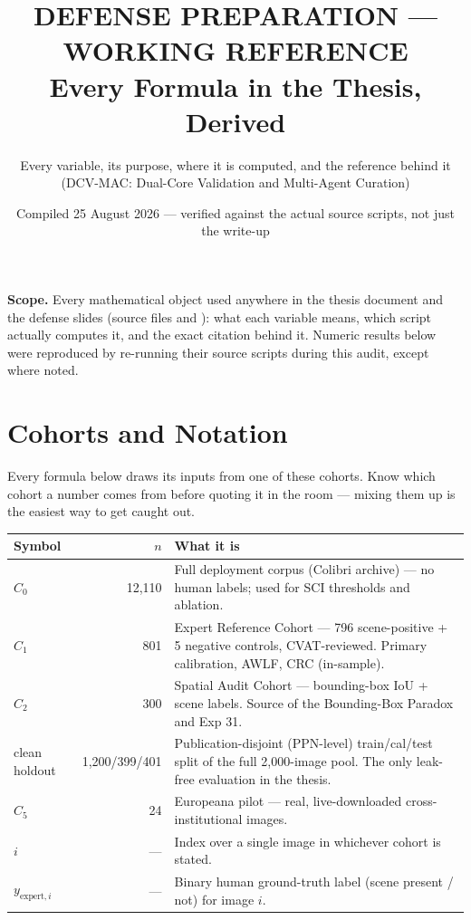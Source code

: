 \documentclass[11pt,a4paper]{article}
\title{\textcolor{AccentInk}{\Large DEFENSE PREPARATION --- WORKING REFERENCE}\\[6pt]
\Huge Every Formula in the Thesis, Derived}
\author{Every variable, its purpose, where it is computed, and the reference behind it \\
\small (DCV-MAC: Dual-Core Validation and Multi-Agent Curation)}
\date{Compiled 25 August 2026 --- verified against the actual source scripts, not just the write-up}
\begin{document}
\maketitle
\thispagestyle{fancy}

\noindent\textbf{Scope.} Every mathematical object used anywhere in the thesis document and the defense slides (source files \texttt{} and \texttt{}): what each variable means, which script actually computes it, and the exact citation behind it. Numeric results below were reproduced by re-running their source scripts during this audit, except where noted.

\tableofcontents
\clearpage

\section{Cohorts and Notation}
Every formula below draws its inputs from one of these cohorts. Know which cohort a number comes from before quoting it in the room --- mixing them up is the easiest way to get caught out.

\begin{center}
\begin{tabular}{@{}lrp{9.7cm}@{}}
\toprule
\textbf{Symbol} & \textbf{$n$} & \textbf{What it is} \\
\midrule
$C_0$ & 12{,}110 & Full deployment corpus (Colibri archive) --- no human labels; used for SCI thresholds and ablation. \\
$C_1$ & 801 & Expert Reference Cohort --- 796 scene-positive + 5 negative controls, CVAT-reviewed. Primary calibration, AWLF, CRC (in-sample). \\
$C_2$ & 300 & Spatial Audit Cohort --- bounding-box IoU + scene labels. Source of the Bounding-Box Paradox and Exp 31. \\
clean holdout & 1{,}200/399/401 & Publication-disjoint (PPN-level) train/cal/test split of the full 2{,}000-image pool. The only leak-free evaluation in the thesis. \\
$C_5$ & 24 & Europeana pilot --- real, live-downloaded cross-institutional images. \\
$i$ & --- & Index over a single image in whichever cohort is stated. \\
$y_{\text{expert},i}$ & --- & Binary human ground-truth label (scene present / not) for image $i$. \\
\bottomrule
\end{tabular}
\end{center}
\end{document}
